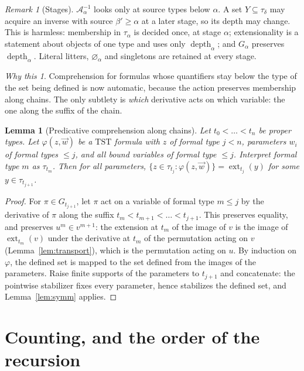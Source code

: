 \documentclass[11pt]{article}
\newtheorem{lemma}[theorem]{Lemma}
\theoremstyle{definition}
\theoremstyle{remark}
\newtheorem{remark}[theorem]{Remark}
\newtheorem*{idea}{Why this}
\newcommand{\TST}{\mathrm{TST}}
\newcommand{\ext}{\operatorname{ext}}
\newcommand{\dep}{\operatorname{depth}}
\newcommand{\calA}{\mathcal A}
\begin{document}
\begin{remark}[Stages]\label{rem:stage}
\(\calA^{-1}_\alpha\) looks only at source types below \(\alpha\). A set
\(Y\subseteq\tau_\delta\) may acquire an inverse with source \(\beta'\geq
\alpha\) at a later stage, so its depth may change. This is harmless:
membership in \(\tau_\alpha\) is decided once, at stage \(\alpha\);
extensionality is a statement about objects of one type and uses only
\(\dep_\alpha\); and \(G_\alpha\) preserves \(\dep_\alpha\). Literal
litters, \(\varnothing_\alpha\) and singletons are retained at every stage.
\end{remark}

\begin{idea}
Comprehension for formulas whose quantifiers stay below the type of the
set being defined is now automatic, because the action preserves
membership along chains. The only subtlety is \emph{which} derivative acts
on which variable: the one along the suffix of the chain.
\end{idea}

\begin{lemma}[Predicative comprehension along chains]\label{lem:pred}
Let \(t_0<\dots<t_n\) be proper types. Let \(\varphi(z,\vec w)\) be a
\(\TST\) formula with \(z\) of formal type \(j<n\), parameters \(w_i\) of
formal types \(\leq j\), and all bound variables of formal type \(\leq j\).
Interpret formal type \(m\) as \(\tau_{t_m}\). Then for all parameters,
\(\{z\in\tau_{t_j}:\varphi(z,\vec w)\}=\ext_{t_j}(y)\) for some \(y\in
\tau_{t_{j+1}}\).
\end{lemma}
\begin{proof}
For \(\pi\in G_{t_{j+1}}\), let \(\pi\) act on a variable of formal type
\(m\leq j\) by the derivative of \(\pi\) along the suffix \(t_m<t_{m+1}<
\dots<t_{j+1}\). This preserves equality, and preserves \(u^{m}\in
v^{m+1}\): the extension at \(t_m\) of the image of \(v\) is the image of
\(\ext_{t_m}(v)\) under the derivative at \(t_m\) of the permutation acting
on \(v\) (Lemma~\ref{lem:transport}), which is the permutation acting on
\(u\). By induction on \(\varphi\), the defined set is mapped to the set
defined from the images of the parameters. Raise finite supports of the
parameters to \(t_{j+1}\) and concatenate: the pointwise stabilizer fixes
every parameter, hence stabilizes the defined set, and
Lemma~\ref{lem:symm} applies.
\end{proof}

\section{Counting, and the order of the recursion}\label{sec:count}
\end{document}
